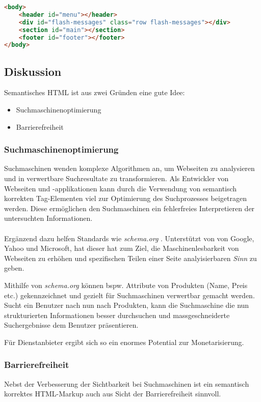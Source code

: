 \begin{lstlisting}[language=HTML, caption=Layout Definition \cite{roomiesHtmlSkeleton}, label=lst:layoutDefinition, firstnumber=27]
<body>
	<header id="menu"></header>
	<div id="flash-messages" class="row flash-messages"></div>
	<section id="main"></section>
	<footer id="footer"></footer>
</body>
\end{lstlisting}

\subsection*{Diskussion}
Semantisches HTML ist aus zwei Gründen eine gute Idee:
\begin{itemize}
	\item Suchmaschinenoptimierung
	\item Barrierefreiheit
\end{itemize}

\subsubsection*{Suchmaschinenoptimierung}
Suchmaschinen wenden komplexe Algorithmen an, um Webseiten zu analysieren und in verwertbare Suchresultate zu transformieren. Als Entwickler von Webseiten und -applikationen kann durch die Verwendung von semantisch korrekten Tag-Elementen viel zur Optimierung des Suchprozesses beigetragen werden. Diese ermöglichen den Suchmaschinen ein fehlerfreies Interpretieren der untersuchten Informationen.
\\ \\
Ergänzend dazu helfen Standards wie \emph{schema.org} \cite{SchemaOrg}. Unterstützt von von Google, Yahoo und Microsoft, hat dieser hat zum Ziel, die Maschinenlesbarkeit von Webseiten zu erhöhen und spezifischen Teilen einer Seite analyisierbaren \emph{Sinn} zu geben.

Mithilfe von \emph{schema.org} können bspw. Attribute von Produkten (Name, Preis etc.) gekennzeichnet und gezielt für Suchmaschinen verwertbar gemacht werden. Sucht ein Benutzer nach nun nach Produkten, kann die Suchmaschine die nun strukturierten Informationen besser durchsuchen und massgeschneiderte Suchergebnisse dem Benutzer präsentieren.

Für Dienstanbieter ergibt sich so ein enormes Potential zur Monetarisierung.

\subsubsection*{Barrierefreiheit}
Nebst der Verbesserung der Sichtbarkeit bei Suchmaschinen ist ein semantisch korrektes HTML-Markup auch aus Sicht der Barrierefreiheit sinnvoll.

